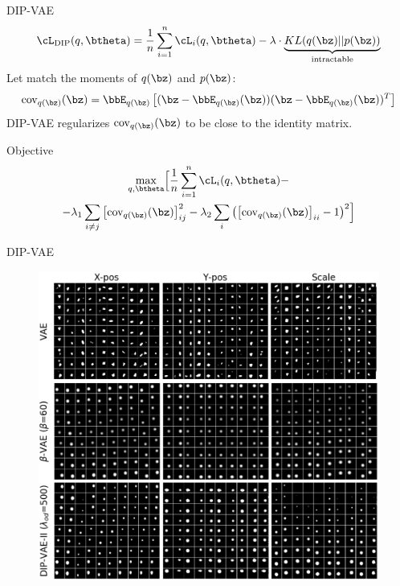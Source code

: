 \begin{frame}{DIP-VAE}
		\vspace{-0.2cm}
		\[
			\cL_{\text{DIP}}(q, \btheta) = \frac{1}{n} \sum_{i=1}^n \cL_i(q, \btheta) -\lambda \cdot \underbrace{KL(q(\bz) || p(\bz))}_{\text{intractable}}
		\]
	Let match the moments of $q(\bz)$ and $p(\bz)$:
	\[
	\text{cov}_{q(\bz)}(\bz) = \bbE_{q(\bz)} \left[ (\bz - \bbE_{q(\bz)}(\bz)) (\bz - \bbE_{q(\bz)}(\bz))^T \right]
	\]
	DIP-VAE regularizes $\text{cov}_{q(\bz)}(\bz) $ to be close to the identity matrix. 
	\begin{block}{Objective}
		\vspace{-0.5cm}
		\begin{multline*}
		\max_{q, \btheta} \Bigl[\frac{1}{n} \sum_{i=1}^n \cL_i(q, \btheta) - \\ - \lambda_1 \sum_{i \neq j} \left[\text{cov}_{q(\bz)} (\bz) \right]^2_{ij} - \lambda_2 \sum_{i} \left( \left[ \text{cov}_{q(\bz)} (\bz) \right]_{ii} - 1 \right)^2 \Bigr]
		\end{multline*}
		\vspace{-0.5cm}
	\end{block}

\end{frame}
\begin{frame}{DIP-VAE}
	\begin{figure}
		\centering
		\includegraphics[width=0.75\linewidth]{figs/dip-vae_1}
	\end{figure}

\end{frame}
